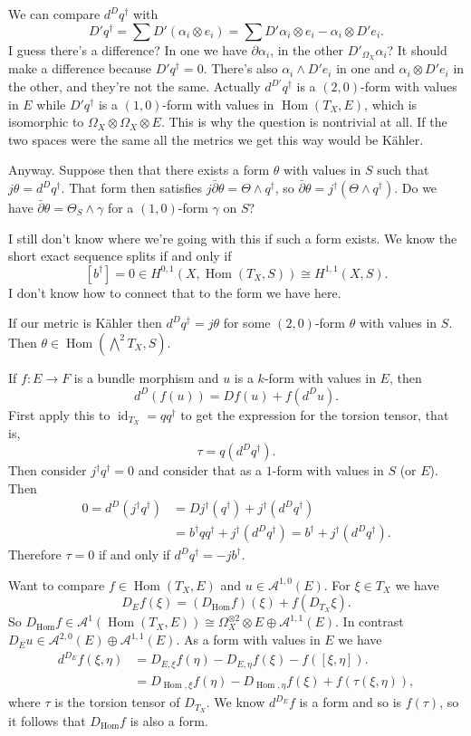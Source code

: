 \documentclass[11pt]{amsart}
\theoremstyle{definition}
\newcommand{\cc}[1]{\mathcal{#1}}
\DeclareMathOperator{\Hom}{Hom}
\DeclareMathOperator{\id}{id}
\begin{document}
We can compare $d^D q^\dagger$ with
\[
D'q^\dagger
= \sum D'(\alpha_i \otimes e_i)
= \sum D'\alpha_i \otimes e_i
- \alpha_i \otimes D'e_i.
\]
I guess there's a difference?
In one we have $\partial \alpha_i$, in the other $D'_{\Omega_X}\alpha_i$?
It should make a difference because $D'q^\dagger = 0$.
There's also $\alpha_i \wedge D'e_i$ in one and $\alpha_i \otimes D'e_i$ in the other, and they're not the same.
Actually $d^{D'} q^\dagger$ is a $(2,0)$-form with values in $E$ while $D' q^\dagger$ is a $(1,0)$-form with values in $\Hom(T_X,E)$, which is isomorphic to $\Omega_X \otimes \Omega_X \otimes E$.
This is why the question is nontrivial at all.
If the two spaces were the same all the metrics we get this way would be K\"ahler.


Anyway.
Suppose then that there exists a form $\theta$ with values in $S$ such that $j\theta = d^D q^\dagger$.
That form then satisfies $j \bar\partial \theta = \Theta \wedge q^\dagger$, so $\bar\partial \theta = j^\dagger(\Theta \wedge q^\dagger)$.
Do we have $\bar\partial \theta = \Theta_S \wedge \gamma$ for a $(1,0)$-form $\gamma$ on $S$?

I still don't know where we're going with this if such a form exists.
We know the short exact sequence splits if and only if 
\[
[b^\dagger] = 0 \in H^{0,1}(X, \Hom(T_X,S))
\cong H^{1,1}(X, S).
\]
I don't know how to connect that to the form we have here.


If our metric is K\"ahler then $d^D q^\dagger = j \theta$ for some $(2,0)$-form $\theta$ with values in $S$.
Then $\theta \in \Hom(\bigwedge^2 T_X, S)$.



If $f : E \to F$ is a bundle morphism and $u$ is a $k$-form with values in $E$, then
\[
d^D(f(u))
= Df(u) + f(d^D u).
\]
First apply this to $\id_{T_X} = qq^\dagger$ to get the expression for the torsion tensor, that is,
\[
\tau = q(d^D q^\dagger).
\]
Then consider $j^\dagger q^\dagger = 0$ and consider that as a $1$-form with values in $S$ (or $E$).
Then
\begin{align*}
0 = d^D(j^\dagger q^\dagger)
&= Dj^\dagger(q^\dagger) + j^\dagger(d^D q^\dagger)
\\
&= b^\dagger q q^\dagger + j^\dagger(d^D q^\dagger)
= b^\dagger + j^\dagger(d^D q^\dagger).
\end{align*}
Therefore $\tau = 0$ if and only if $d^D q^\dagger = - j b^\dagger$.

Want to compare $f \in \Hom(T_X, E)$ and $u \in \cc A^{1,0}(E)$.
For $\xi \in T_X$ we have
\[
D_E f(\xi)
= (D_{\Hom} f)(\xi) + f(D_{T_X} \xi).
\]
So $D_{\Hom}f \in \cc A^{1}(\Hom(T_X,E)) \cong \Omega_X^{\otimes 2} \otimes E \oplus \cc A^{1,1}(E)$.
In contrast $D_E u \in \cc A^{2,0}(E) \oplus \cc A^{1,1}(E)$.
As a form with values in $E$ we have
\begin{align*}
d^{D_E} f(\xi,\eta)
&= D_{E,\xi} f(\eta) - D_{E,\eta} f(\xi) - f([\xi, \eta]).
\\
&= D_{\Hom,\xi}f(\eta) - D_{\Hom,\eta}f(\xi) + f(\tau(\xi,\eta)),
\end{align*}
where $\tau$ is the torsion tensor of $D_{T_X}$.
We know $d^{D_E}f$ is a form and so is $f(\tau)$, so it follows that $D_{\Hom}f$ is also a form.
\end{document}
